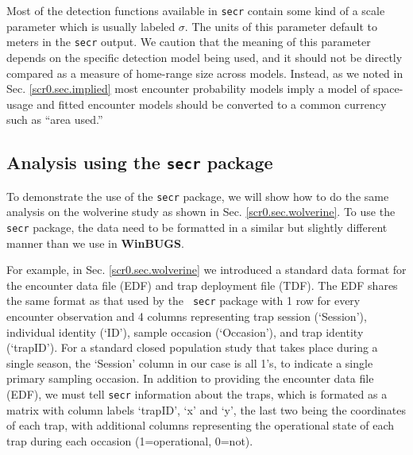 Most of the detection functions available in \mbox{\tt secr} contain
some kind of a scale parameter which is usually labeled $\sigma$.  The
units of this parameter default to meters in the \mbox{\tt secr}
output.  We caution that the meaning of this parameter depends on the
specific detection model being used, and it should not be directly
compared as a measure of home-range size across models. Instead, as we
noted in Sec. \ref{scr0.sec.implied} most encounter probability models
imply a model of space-usage and fitted encounter models should be
converted to a common currency such as ``area used.''


\subsection{Analysis using the \mbox{\tt secr} package}
\label{mle.sec.wolvsecr}

To demonstrate the use of the \mbox{\tt secr} package, we will show
how to do the same analysis on the wolverine study as shown in
Sec. \ref{scr0.sec.wolverine}. To use the \mbox{\tt secr} package, the
data need to be formatted in a similar but slightly different manner
than we use in {\bf WinBUGS}.

For example, in Sec. \ref{scr0.sec.wolverine} we introduced a standard
data format for the encounter data file (EDF) and trap deployment file
(TDF). The EDF shares the same format as that used by the \mbox{\tt
  secr} package with 1 row for every encounter observation and 4
columns representing trap session (`Session'), individual identity
(`ID'), sample occasion (`Occasion'), and trap identity (`trapID').
For a standard closed population study that takes place during a
single season, the `Session' column in our case is all 1's, to
indicate a single primary sampling occasion.  In addition to providing
the encounter data file (EDF), we must tell \mbox{\tt secr}
information about the traps, which is formated as a matrix with column
labels `trapID', `x' and `y', the last two being the coordinates of
each trap, with additional columns representing the operational state
of each trap during each occasion (1=operational, 0=not).

